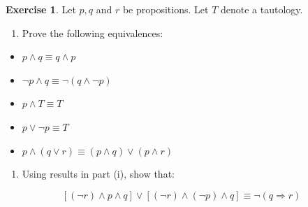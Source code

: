 \documentclass[
]{book}
\providecommand{\tightlist}{%
  \setlength{\itemsep}{0pt}\setlength{\parskip}{0pt}}
\theoremstyle{definition}
\theoremstyle{definition}
\theoremstyle{definition}
\newtheorem{exercise}{Exercise}[chapter]
\theoremstyle{definition}
\theoremstyle{remark}
\begin{document}
\begin{exercise}
\protect\hypertarget{exr:unnamed-chunk-137}{}\label{exr:unnamed-chunk-137}Let \(p, q\) and \(r\) be propositions. Let \(T\) denote a tautology.

\begin{enumerate}
\def\labelenumi{(\roman{enumi})}
\tightlist
\item
  Prove the following equivalences:
\end{enumerate}

\begin{itemize}
\tightlist
\item
  \(p \land q \equiv q \land p\)
\item
  \(\neg p \land q \equiv \neg (q \land \neg p)\)
\item
  \(p \land T \equiv T\)
\item
  \(p \lor \neg p \equiv T\)
\item
  \(p \land (q \lor r) \equiv (p \land q) \lor (p \land r)\)
\end{itemize}

\begin{enumerate}
\def\labelenumi{(\roman{enumi})}
\setcounter{enumi}{1}
\tightlist
\item
  Using results in part (i), show that:
\end{enumerate}

\[
[(\neg r) \land p \land q] \lor [(\neg r) \land (\neg p) \land q] \equiv \neg (q \Rightarrow r)
\]
\end{exercise}
\end{document}
